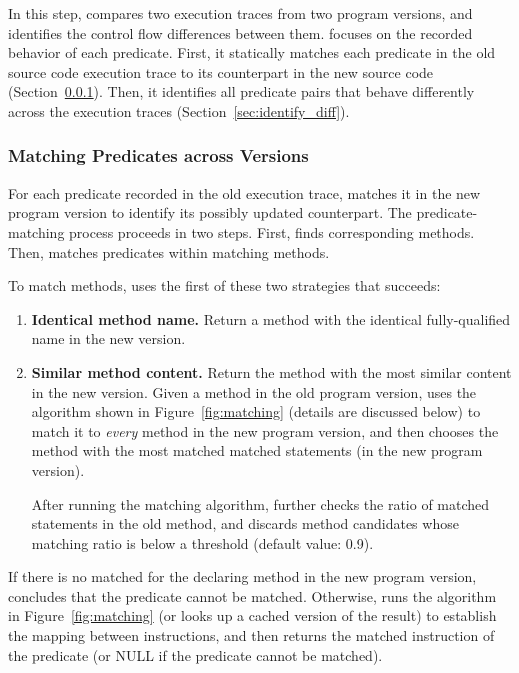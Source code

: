 

In this step, \ourtool compares two execution traces
from two program versions, and identifies the
control flow differences between them. \ourtool focuses on the
recorded behavior of each predicate.
First, it statically
matches each predicate in the old
source code execution trace to its counterpart in the new source code
(Section~\ref{sec:match_predicate}).
Then, it identifies all predicate pairs that
behave differently across the execution traces (Section~\ref{sec:identify_diff}).


\subsubsection{Matching Predicates across Versions}
\label{sec:match_predicate}

For each predicate recorded in the old execution trace,
\ourtool matches it in the new program version to identify
its possibly updated counterpart.
The predicate-matching process proceeds in two steps.
First, \ourtool finds corresponding methods.
Then, \ourtool matches predicates within matching methods.

To match methods, \ourtool uses
the first of these two strategies that succeeds:



\begin{enumerate}
\item \textbf{Identical method name.} Return a method with the identical
fully-qualified name in the new version.
\item \textbf{Similar method content.} Return the method with
the most similar content in the new version. Given
a method in the old program version, \ourtool
uses the algorithm shown in Figure~\ref{fig:matching}
(details are discussed below) to match it
to \textit{every} method in the new program version, and then
chooses the method with the most matched matched statements
(in the new program version).

After running the matching algorithm, \ourtool further checks the ratio of
matched statements in the old method, and discards method candidates whose
matching ratio is below a threshold (default value: 0.9).
\end{enumerate}


If there is no matched for the declaring method in the new program
version, \ourtool concludes that the predicate cannot be
matched. Otherwise, \ourtool runs the algorithm
in Figure~\ref{fig:matching} (or looks up a cached version of the result)
to establish the mapping between
instructions, and then returns the matched instruction of the
predicate (or NULL if the predicate cannot be matched).


